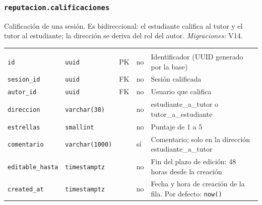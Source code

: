 \subsubsection{\texorpdfstring{\texttt{reputacion.calificaciones}}{reputacion.calificaciones}}\label{dd:reputacion.calificaciones}

Calificación de una sesión. Es bidireccional: el estudiante califica al tutor y el tutor al estudiante; la dirección se deriva del rol del autor. \emph{Migraciones:} V14.

{\small
\begin{xltabular}{\textwidth}{@{}>{\raggedright\arraybackslash}p{3.6cm} >{\raggedright\arraybackslash}p{2.3cm} >{\raggedright\arraybackslash}p{1cm} >{\centering\arraybackslash}p{0.85cm} L@{}}
    \toprule
     &  &  &  &  \\
    \midrule
    \endfirsthead
    \toprule
     &  &  &  &  \\
    \midrule
    \endhead
    \bottomrule
    \endfoot
    \texttt{id} & \texttt{uuid} & PK & no & Identificador (UUID generado por la base) \\
    \texttt{sesion\_\allowbreak{}id} & \texttt{uuid} & FK & no & Sesión calificada \\
    \texttt{autor\_\allowbreak{}id} & \texttt{uuid} & FK & no & Usuario que califica \\
    \texttt{direccion} & \texttt{varchar(\allowbreak{}30)} &  & no & estudiante\_a\_tutor o tutor\_a\_estudiante \\
    \texttt{estrellas} & \texttt{smallint} &  & no & Puntaje de 1 a 5 \\
    \texttt{comentario} & \texttt{varchar(\allowbreak{}1000)} &  & sí & Comentario; solo en la dirección estudiante\_a\_tutor \\
    \texttt{editable\_\allowbreak{}hasta} & \texttt{timestamptz} &  & no & Fin del plazo de edición: 48 horas desde la creación \\
    \texttt{created\_\allowbreak{}at} & \texttt{timestamptz} &  & no & Fecha y hora de creación de la fila. Por defecto: \texttt{now(\allowbreak{})} \\
\end{xltabular}
}

